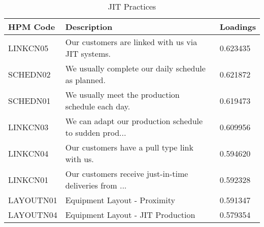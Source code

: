 \begin{table}[htbp]
\centering
\caption{JIT Practices}
\label{tab:your_label}
\begin{tabular}{lll}
\toprule
HPM Code & Description & Loadings \\
\midrule
LINKCN05 & Our customers are linked with us via JIT systems. & 0.623435 \\
SCHEDN02 & We usually complete our daily schedule as planned. & 0.621872 \\
SCHEDN01 & We usually meet the production schedule each day. & 0.619473 \\
LINKCN03 & We can adapt our production schedule to sudden prod... & 0.609956 \\
LINKCN04 & Our customers have a pull type link with us. & 0.594620 \\
LINKCN01 & Our customers receive just-in-time deliveries from ... & 0.592328 \\
LAYOUTN01 & Equipment Layout - Proximity & 0.591347 \\
LAYOUTN04 & Equipment Layout - JIT Production & 0.579354 \\
\bottomrule
\end{tabular}
\end{table}